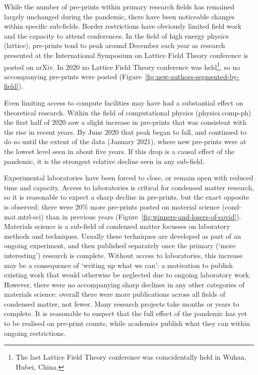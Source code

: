 \documentclass{nature}
\newcommand{\arxiv}{arXiv}
\begin{document}
While the number of pre-prints within primary research fields has remained largely unchanged during the pandemic, there have been noticeable changes within specific sub-fields. Border restrictions have obviously limited field work and the capacity to attend conferences. In the field of high energy physics (lattice), pre-prints tend to peak around December each year as research presented at the International Symposium on Lattice Field Theory conference is posted on \arxiv. In 2020 no Lattice Field Theory conference was held\footnote{The last Lattice Field Theory conference was coincidentally held in Wuhan, Hubei, China.}, so no accompanying pre-prints were posted (Figure~\ref{fig:new-authors-segmented-by-field}). 

Even limiting access to compute facilities may have had a substantial effect on theoretical research. Within the field of computational physics (physics.comp-ph) the first half of 2020 saw a slight increase in pre-prints that was consistent with the rise in recent years. By June 2020 that peak began to fall, and continued to do so until the extent of the data (January 2021), where new pre-prints were at the lowest level seen in about five years. If this drop is a causal effect of the pandemic, it is the strongest relative decline seen in any sub-field.


Experimental laboratories have been forced to close, or remain open with reduced time and capacity. Access to laboratories is critical for condensed matter research, so it is reasonable to expect a sharp decline in pre-prints, but the exact opposite is observed: there were 20\% more pre-prints posted on material science (cond-mat.mtrl-sci) than in previous years (Figure~\ref{fig:winners-and-losers-of-covid}). Materials science is a sub-field of condensed matter focusses on laboratory methods and techniques. Usually these techniques are developed as part of an ongoing experiment, and then published separately once the primary (`more interesting') research is complete. Without access to laboratories, this increase may be a consequence of `writing up what we can': a motivation to publish existing work that would otherwise be neglected due to ongoing laboratory work. However, there were no accompanying sharp declines in any other categories of materials science: overall there were more publications across all fields of condensed matter, not fewer. Many research projects take months or years to complete. It is reasonable to suspect that the full effect of the pandemic has yet to be realised on pre-print counts, while academics publish what they can within ongoing restrictions.
\end{document}
